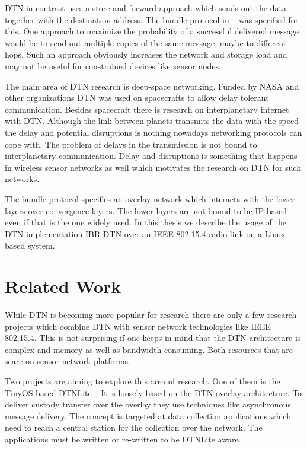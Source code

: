 DTN in contrast uses a store and forward approach which sends out the data
together with the destination address. The bundle protocol in ~\cite{RFC5050} was specified for this. One approach to maximize the probability
of a successful delivered message would be to send out multiple copies of the
same message, maybe to different hops. Such an approach obviously increases the
network and storage load and may not be useful for constrained devices like
sensor nodes.

The main area of DTN research is deep-space networking. Funded by NASA and other
organizations DTN was used on spacecrafts to allow delay tolerant communication.
Besides spacecraft there is research on interplanetary internet with DTN.
Although the link between planets transmits the data with the speed the delay
and potential disruptions is nothing nowadays networking protocols can cope
with. The problem of delays in the transmission is not bound to interplanetary
communication. Delay and disruptions is something that happens in wireless
sensor networks as well which motivates the research on DTN for such networks.

The bundle protocol specifies an overlay network which interacts with the lower
layers over convergence layers. The lower layers are not bound to be IP
based even if that is the one widely used. In this thesis we describe the usage
of the DTN implementation IBR-DTN over an IEEE 802.15.4 radio link on a Linux
based system.

\section{Related Work}
\label{relatedwork}

While DTN is becoming more popular for research there are only a few research
projects which combine DTN with sensor network technologies like IEEE 802.15.4.
This is not surprising if one keeps in mind that the DTN architecture is
complex and memory as well as bandwidth consuming. Both resources that are scare
on sensor network platforms.

Two projects are aiming to explore this area of research. One of them is the
TinyOS based DTNLite~\cite{dtnlite}. It is loosely based on the DTN overlay
architecture. To deliver custody transfer over the overlay they use techniques
like asynchronous message delivery. The concept is targeted at data collection
applications which need to reach a central station for the collection over the
network. The applications must be written or re-written to be DTNLite aware.

